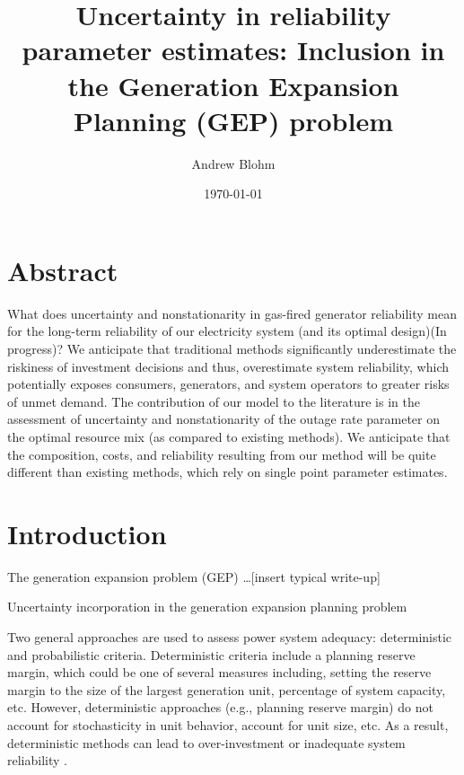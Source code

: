 \documentclass[10pt]{amsart}
\title{Uncertainty in reliability parameter estimates: Inclusion in the Generation Expansion Planning (GEP) problem}
\author{Andrew Blohm}
\date{\today}
\begin{document}
\maketitle

\section{Abstract}
What does uncertainty and nonstationarity in gas-fired generator reliability mean for the long-term reliability of our electricity system (and its optimal design)(In progress)? 
We anticipate that traditional methods significantly underestimate the riskiness of investment decisions and thus, overestimate system reliability, which potentially exposes consumers, generators, and system operators to greater risks of unmet demand. 
The contribution of our model to the literature is in the assessment of uncertainty and nonstationarity of the outage rate parameter on the optimal resource mix (as compared to existing methods). 
We anticipate that the composition, costs, and reliability resulting from our method will be quite different than existing methods, which rely on single point parameter estimates. 

\section{Introduction}
The generation expansion problem (GEP) \ldots [insert typical write-up]

Uncertainty incorporation in the generation expansion planning problem

Two general approaches are used to assess power system adequacy: deterministic and probabilistic criteria. 
Deterministic criteria include a planning reserve margin, which could be one of several measures including, setting the reserve margin to the size of the largest generation unit, percentage of system capacity, etc. 
However, deterministic approaches (e.g., planning reserve margin) do not account for stochasticity in unit behavior, account for unit size, etc.
As a result, deterministic methods can lead to over-investment or inadequate system reliability \parencite{aghaei:2013aa}.
\end{document}
